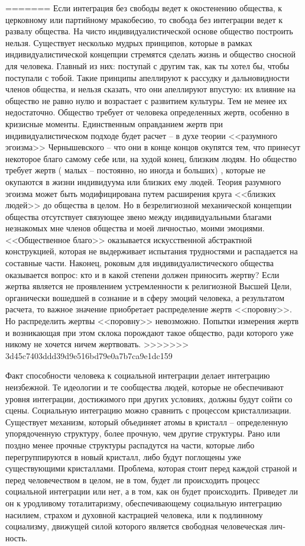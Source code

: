\documentclass{book}
\begin{document}
=======
Если интеграция без свободы ведет к окостенению общест­ва, к церковному или партийному мракобесию, то свобода без интеграции ведет к развалу общества. На чисто индивидуали­стической основе общество построить нельзя. Существует не­сколько мудрых принципов, которые в рамках индивидуали­стической концепции стремятся сделать жизнь и общество снос­ной для человека. Главный из них: поступай с другим так, как ты хотел бы, чтобы поступали с тобой. Такие принципы апел­лируют к рассудку и дальновидности членов общества, и нель­зя сказать, что они апеллируют впустую: их влияние на общест­во не равно нулю и возрастает с развитием культуры. Тем не менее их недостаточно. Общество требует от человека опре­деленных жертв, особенно в кризисные моменты. Единственным оправданием жертв при индивидуалистическом подходе будет расчет -- в духе теории <<разумного эгоизма>> Чернышевского -- что они в конце концов окупятся тем, что принесут некоторое благо самому себе или, на худой конец, близким людям. Но об­щество требует жертв (
малых -- постоянно, но иногда и боль­ших) , которые не окупаются в жизни индивидуума или близ­ких ему людей. Теория разумного эгоизма может быть моди­фицирована путем расширения круга <<близких людей>> до об­щества в целом. Но в безрелигиозной механической концеп­ции общества отсутствует связующее звено между индивиду­альными благами незнакомых мне членов общества и моей лич­ностью, моими эмоциями. <<Общественное благо>> оказывается искусственной абстрактной конструкцией, которая не выдер­живает испытания трудностями и распадается на составные части. Наконец, роковым для индивидуалистического общест­ва оказывается вопрос: кто и в какой степени должен прино­сить жертву? Если жертва является не проявлением устремлен­ности к религиозной Высшей Цели, органически вошедшей в сознание и в сферу эмоций человека, а результатом расчета, то важное значение приобретает распределение жертв <<поров­ну>>. Но распределить жертвы <<поровну>> невозможно. Попыт­ки измерения жертв и возникающая при этом склока порож­дают такое общество,
 ради которого уже никому не хочется ничем жертвовать.
>>>>>>> 3d45c7403ddd39d9e516bd79e0a7b7ca9e1dc159

Факт способности человека к социальной интеграции делает интеграцию неизбежной. Те идеологии и те сообщества людей, которые не обеспечивают уровня интеграции, достижимого при других условиях, должны будут сойти со сцены. Социаль­ную интеграцию можно сравнить с процессом кристаллизации. Существует механизм, который объединяет атомы в кристалл -- определенную упорядоченную структуру, более прочную, чем другие структуры. Рано или поздно менее прочные структуры распадутся на части, которые либо перегруппируются в новый кристалл, либо будут поглощены уже существующими крис­таллами. Проблема, которая стоит перед каждой страной и перед человечеством в целом, не в том, будет ли происходить про­цесс социальной интеграции или нет, а в том, как  он будет про­исходить. Приведет ли он к уродливому тоталитаризму, обеспечивающему социальную интеграцию насилием, страхом и духов­ной кастрацией человека, или к подлинному социализму, дви­жущей силой которого является свободная человеческая лич­ность.
\end{document}
